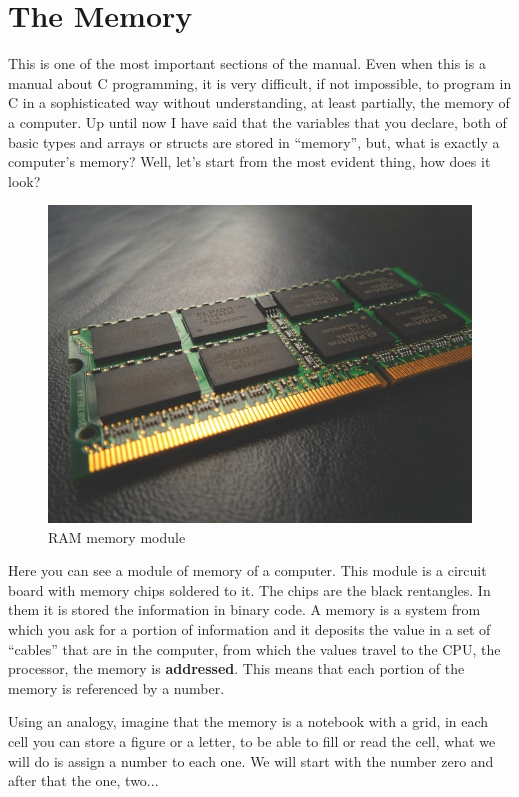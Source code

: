\documentclass[a4paper]{article}
\begin{document}
\section{The Memory}
This is one of the most important sections of the manual. Even when this is a
manual about C programming, it is very difficult, if not impossible, to program
in C in a sophisticated way without understanding, at least partially, the
memory of a computer. Up until now I have said that the variables that you
declare, both of basic types and arrays or structs are stored in ``memory'',
but, what is exactly a computer's memory? Well, let's start from the most
evident thing, how does it look?
\begin{figure}[H]
    \includegraphics[width=\linewidth]{ram}
    \caption{RAM memory module}
    \label{img:ram}
\end{figure}

Here you can see a module of memory of a computer. This module is a circuit
board with memory chips soldered to it. The chips are the black rentangles.
In them it is stored
the information in binary code. A memory is a system from which you ask for a
portion of information and it deposits the value in a set of ``cables'' that
are in the computer, from which the values travel to the CPU, the processor,
the memory is \textbf{addressed}. This means that each portion of the memory
is referenced by a number.

Using an analogy, imagine that the memory is a notebook with a grid, in each
cell you can store a figure or a letter, to be able to fill or read the
cell, what we will do is assign a number to each one. We will start
with the number zero and after that the one, two...
\end{document}
